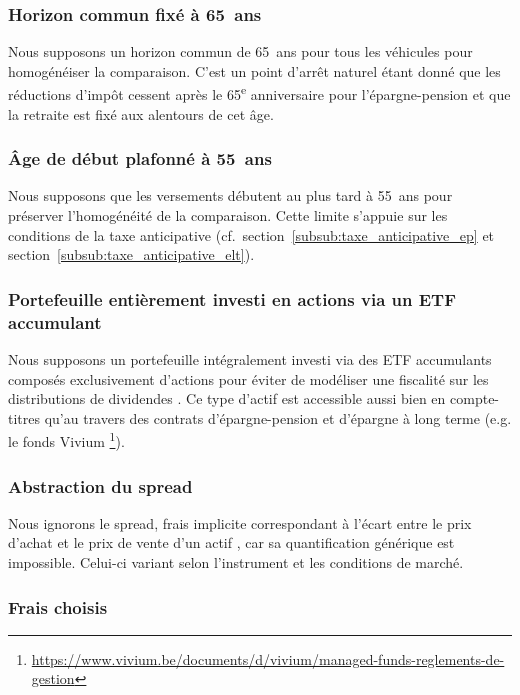 ﻿\documentclass[12pt, a4paper]{article}
\begin{document}
\subsubsection*{Horizon commun fixé à 65~ans}

Nous supposons un horizon commun de 65~ans pour tous les véhicules pour homogénéiser la
comparaison. C'est un point d'arrêt naturel étant donné que les réductions d'impôt cessent après le
65\textsuperscript{e} anniversaire pour l'épargne-pension et que la retraite est fixé
aux alentours de cet âge.

\subsubsection*{Âge de début plafonné à 55~ans}

Nous supposons que les versements débutent au plus tard à 55~ans pour préserver
l'homogénéité de la comparaison. Cette limite s'appuie sur les conditions de la taxe
anticipative (cf.~section~\ref{subsub:taxe_anticipative_ep} et
section~\ref{subsub:taxe_anticipative_elt}).

\subsubsection*{Portefeuille entièrement investi en actions via un ETF accumulant}

Nous supposons un portefeuille intégralement investi via des ETF
accumulants composés exclusivement d'actions pour éviter de modéliser une fiscalité sur les distributions de dividendes \cite{curvo_capitalisant_distribuant_2026}. 
Ce type
d'actif est accessible aussi bien en compte-titres qu'au travers des contrats d'épargne-pension
et d'épargne à long terme (e.g. le fonds Vivium \footnote{\url{https://www.vivium.be/documents/d/vivium/managed-funds-reglements-de-gestion}}).

\subsubsection*{Abstraction du spread}

Nous ignorons le spread, frais implicite correspondant à l'écart entre le prix
d'achat et le prix de vente d'un actif \cite{wikiped_spread}, car sa quantification
générique est impossible. Celui-ci variant selon l'instrument et les conditions
de marché.

\subsubsection*{Frais choisis}
\label{subsub:frais_choisis}
\end{document}
